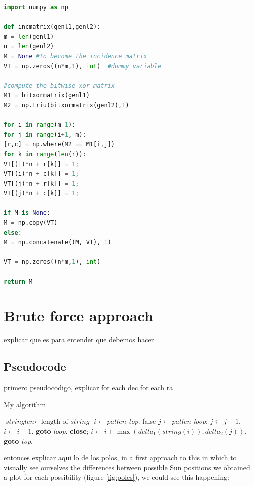 \begin{lstlisting}[language=Python, caption=Python example]
import numpy as np

def incmatrix(genl1,genl2):
m = len(genl1)
n = len(genl2)
M = None #to become the incidence matrix
VT = np.zeros((n*m,1), int)  #dummy variable

#compute the bitwise xor matrix
M1 = bitxormatrix(genl1)
M2 = np.triu(bitxormatrix(genl2),1) 

for i in range(m-1):
for j in range(i+1, m):
[r,c] = np.where(M2 == M1[i,j])
for k in range(len(r)):
VT[(i)*n + r[k]] = 1;
VT[(i)*n + c[k]] = 1;
VT[(j)*n + r[k]] = 1;
VT[(j)*n + c[k]] = 1;

if M is None:
M = np.copy(VT)
else:
M = np.concatenate((M, VT), 1)

VT = np.zeros((n*m,1), int)

return M
\end{lstlisting}




\section{Brute force approach}

explicar que es para entender que debemos hacer

\subsection{Pseudocode}

primero pseudocodigo, explicar for each dec for each ra


\begin{algorithm}
	\caption{My algorithm}\label{euclid}
	\begin{algorithmic}[1]
		\State $\textit{stringlen} \gets \text{length of }\textit{string}$
		\State $i \gets \textit{patlen}$
		\BState \emph{top}:
		 \Return false
		\EndIf
		\State $j \gets \textit{patlen}$
		\BState \emph{loop}:
		\State $j \gets j-1$.
		\State $i \gets i-1$.
		\State \textbf{goto} \emph{loop}.
		\State \textbf{close};
		\EndIf
		\State $i \gets i+\max(\textit{delta}_1(\textit{string}(i)),\textit{delta}_2(j))$.
		\State \textbf{goto} \emph{top}.
		\EndProcedure
	\end{algorithmic}
\end{algorithm}

entonces explicar aqui lo de los polos, in a first approach to this in which to visually see ourselves the differences between possible Sun positions we obtained a plot for each possibility (figure \ref{fig:poles}), we could see this happening:

